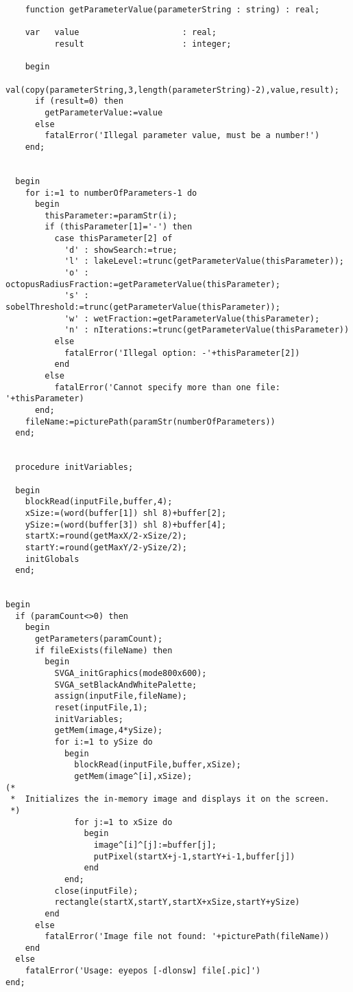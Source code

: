\begin{verbatim}
    function getParameterValue(parameterString : string) : real;

    var   value                     : real;
          result                    : integer;

    begin
      val(copy(parameterString,3,length(parameterString)-2),value,result);
      if (result=0) then
        getParameterValue:=value
      else
        fatalError('Illegal parameter value, must be a number!')
    end;


  begin
    for i:=1 to numberOfParameters-1 do
      begin
        thisParameter:=paramStr(i);
        if (thisParameter[1]='-') then
          case thisParameter[2] of
            'd' : showSearch:=true;
            'l' : lakeLevel:=trunc(getParameterValue(thisParameter));
            'o' : octopusRadiusFraction:=getParameterValue(thisParameter);
            's' : sobelThreshold:=trunc(getParameterValue(thisParameter));
            'w' : wetFraction:=getParameterValue(thisParameter);
            'n' : nIterations:=trunc(getParameterValue(thisParameter))
          else
            fatalError('Illegal option: -'+thisParameter[2])
          end
        else
          fatalError('Cannot specify more than one file: '+thisParameter)
      end;
    fileName:=picturePath(paramStr(numberOfParameters))
  end;


  procedure initVariables;

  begin
    blockRead(inputFile,buffer,4);
    xSize:=(word(buffer[1]) shl 8)+buffer[2];
    ySize:=(word(buffer[3]) shl 8)+buffer[4];
    startX:=round(getMaxX/2-xSize/2);
    startY:=round(getMaxY/2-ySize/2);
    initGlobals
  end;


begin
  if (paramCount<>0) then
    begin
      getParameters(paramCount);
      if fileExists(fileName) then
        begin
          SVGA_initGraphics(mode800x600);
          SVGA_setBlackAndWhitePalette;
          assign(inputFile,fileName);
          reset(inputFile,1);
          initVariables;
          getMem(image,4*ySize);
          for i:=1 to ySize do
            begin
              blockRead(inputFile,buffer,xSize);
              getMem(image^[i],xSize);
(*
 *  Initializes the in-memory image and displays it on the screen.
 *)
              for j:=1 to xSize do
                begin
                  image^[i]^[j]:=buffer[j];
                  putPixel(startX+j-1,startY+i-1,buffer[j])
                end
            end;
          close(inputFile);
          rectangle(startX,startY,startX+xSize,startY+ySize)
        end
      else
        fatalError('Image file not found: '+picturePath(fileName))
    end
  else
    fatalError('Usage: eyepos [-dlonsw] file[.pic]')
end;



\end{verbatim}
